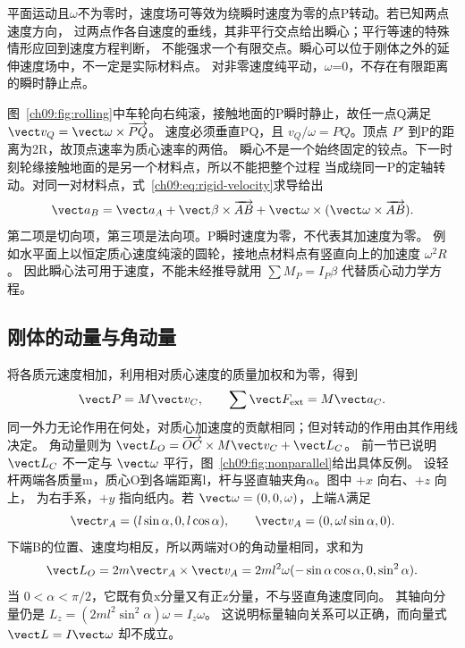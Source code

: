 平面运动且$\omega$不为零时，速度场可等效为绕瞬时速度为零的点P转动。若已知两点速度方向，
过两点作各自速度的垂线，其非平行交点给出瞬心；平行等速的特殊情形应回到速度方程判断，
不能强求一个有限交点。瞬心可以位于刚体之外的延伸速度场中，不一定是实际材料点。
对非零速度纯平动，$\omega$=0，不存在有限距离的瞬时静止点。

图~\ref{ch09:fig:rolling}中车轮向右纯滚，接触地面的P瞬时静止，故任一点Q满足
$\vect v_Q=\vect\omega\times\overrightarrow{PQ}$。
速度必须垂直PQ，且 $v_Q/\omega=PQ$。顶点 $P'$ 到P的距离为2R，故顶点速率为质心速率的两倍。
\rollingKinematicsDiagram
瞬心不是一个始终固定的铰点。下一时刻轮缘接触地面的是另一个材料点，所以不能把整个过程
当成绕同一P的定轴转动。对同一对材料点，式~\eqref{ch09:eq:rigid-velocity}求导给出
\begin{equation}
 \vect a_B=\vect a_A+\vect\beta\times\overrightarrow{AB}
 +\vect\omega\times(\vect\omega\times\overrightarrow{AB}).
\end{equation}
第二项是切向项，第三项是法向项。P瞬时速度为零，不代表其加速度为零。
例如水平面上以恒定质心速度纯滚的圆轮，接地点材料点有竖直向上的加速度 $\omega^2R$。
因此瞬心法可用于速度，不能未经推导就用 $\sum M_P=I_P\beta$ 代替质心动力学方程。

\subsection{刚体的动量与角动量}
将各质元速度相加，利用相对质心速度的质量加权和为零，得到
\begin{equation}
 \vect P=M\vect v_C,\qquad \sum\vect F_{\rm ext}=M\vect a_C.
\end{equation}
同一外力无论作用在何处，对质心加速度的贡献相同；但对转动的作用由其作用线决定。
角动量则为 $\vect L_O=\overrightarrow{OC}\times M\vect v_C+\vect L_C$。
前一节已说明 $\vect L_C$ 不一定与 $\vect\omega$ 平行，图~\ref{ch09:fig:nonparallel}给出具体反例。
\nonparallelAngularDiagram
设轻杆两端各质量m，质心O到各端距离l，杆与竖直轴夹角$\alpha$。图中 $+x$ 向右、$+z$ 向上，
为右手系，$+y$ 指向纸内。若 $\vect\omega=(0,0,\omega)$，上端A满足
\begin{equation}
 \vect r_A=(l\sin\alpha,0,l\cos\alpha),\qquad
 \vect v_A=(0,\omega l\sin\alpha,0).
\end{equation}
下端B的位置、速度均相反，所以两端对O的角动量相同，求和为
\begin{equation}
 \vect L_O=2m\vect r_A\times\vect v_A
 =2ml^2\omega(-\sin\alpha\cos\alpha,0,\sin^2\alpha).
\end{equation}
当 $0<\alpha<\pi/2$，它既有负x分量又有正z分量，不与竖直角速度同向。
其轴向分量仍是 $L_z=(2ml^2\sin^2\alpha)\omega=I_z\omega$。
这说明标量轴向关系可以正确，而向量式 $\vect L=I\vect\omega$ 却不成立。

